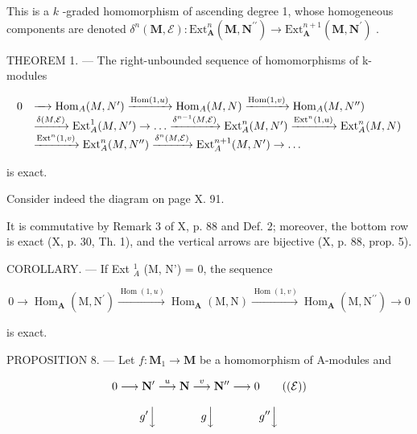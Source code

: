 This is a \(k\) -graded homomorphism of ascending degree 1, whose homogeneous components are denoted \(\delta^n (\mathbf{M},\mathcal{E})\colon \mathrm{Ext}_{\mathbf{A}}^{n}(\mathbf{M},\mathbf{N}^{\prime \prime})\to \mathrm{Ext}_{\mathbf{A}}^{n + 1}(\mathbf{M},\mathbf{N}^{\prime})\) .

THEOREM 1. --- The right-unbounded sequence of homomorphisms of k-modules

\[
\begin{array}{r l} 0 & \xrightarrow {\quad} \mathrm{Hom} _ {A} (M, N ^ {\prime}) \xrightarrow {\mathrm{Hom} (1 , u)} \mathrm{Hom} _ {A} (M, N) \xrightarrow {\mathrm{Hom} (1 , v)} \mathrm{Hom} _ {A} (M, N ^ {\prime \prime}) \\ & \xrightarrow {\delta (M , \mathcal {E})} \mathrm{Ext} _ {A} ^ {1} (M, N ^ {\prime}) \to \dots \xrightarrow {\delta^ {n - 1} (M , \mathcal {E})} \mathrm{Ext} _ {A} ^ {n} (M, N ^ {\prime}) \xrightarrow {\mathrm{Ext} ^ {n} (1 , u)} \mathrm{Ext} _ {A} ^ {n} (M, N) \\ & \xrightarrow {\mathrm{Ext} ^ {n} (1 , v)} \mathrm{Ext} _ {A} ^ {n} (M, N ^ {\prime \prime}) \xrightarrow {\delta^ {n} (M , \mathcal {E})} \mathrm{Ext} _ {A} ^ {n + 1} (M, N ^ {\prime}) \to \dots \end{array}
\]

is exact.

Consider indeed the diagram on page X. 91.

It is commutative by Remark 3 of X, p. 88 and Def. 2; moreover, the bottom row is exact (X, p. 30, Th. 1), and the vertical arrows are bijective (X, p. 88, prop. 5).

COROLLARY. --- If Ext \(_{A}^{1}\) (M, N') = 0, the sequence

\[
0 \longrightarrow \operatorname{Hom} _ {\mathbf {A}} (\mathrm{M}, \mathrm{N} ^ {\prime}) \xrightarrow {\operatorname{Hom} (1 , u)} \operatorname{Hom} _ {\mathbf {A}} (\mathrm{M}, \mathrm{N}) \xrightarrow {\operatorname{Hom} (1 , v)} \operatorname{Hom} _ {\mathbf {A}} (\mathrm{M}, \mathrm{N} ^ {\prime \prime}) \longrightarrow 0
\]

is exact.

PROPOSITION 8. --- Let \(f: \mathbf{M}_{1} \to \mathbf{M}\) be a homomorphism of A-modules and

\[
0 \longrightarrow \mathbf {N} ^ {\prime} \stackrel {u} {\longrightarrow} \mathbf {N} \stackrel {v} {\longrightarrow} \mathbf {N} ^ {\prime \prime} \longrightarrow 0\tag{$(\mathcal{E})$}
\]

\[
g ^ {\prime} \Big \downarrow \qquad \qquad g \Big \downarrow \qquad \qquad g ^ {\prime \prime} \Big \downarrow
\]


